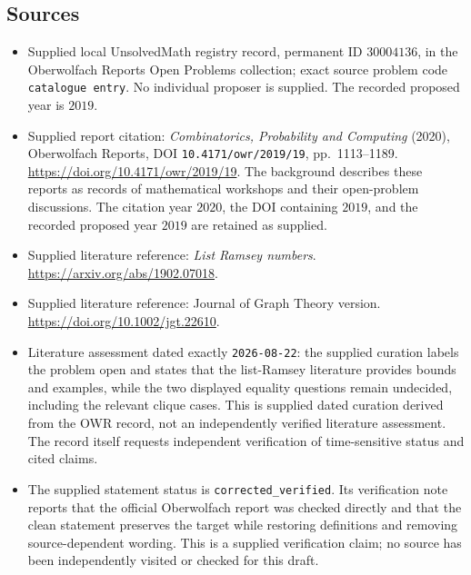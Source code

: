 \documentclass[11pt]{article}
\begin{document}
\subsection{Sources}
\begin{itemize}
\item Supplied local UnsolvedMath registry record, permanent ID \(30004136\), in the Oberwolfach Reports Open Problems collection; exact source problem code \texttt{catalogue entry}. No individual proposer is supplied. The recorded proposed year is \(2019\).
\item Supplied report citation: \emph{Combinatorics, Probability and Computing} (2020), Oberwolfach Reports, DOI \texttt{10.4171/owr/2019/19}, pp.~1113--1189. \url{https://doi.org/10.4171/owr/2019/19}. The background describes these reports as records of mathematical workshops and their open-problem discussions. The citation year \(2020\), the DOI containing \(2019\), and the recorded proposed year \(2019\) are retained as supplied.
\item Supplied literature reference: \emph{List Ramsey numbers}. \url{https://arxiv.org/abs/1902.07018}.
\item Supplied literature reference: Journal of Graph Theory version. \url{https://doi.org/10.1002/jgt.22610}.
\item Literature assessment dated exactly \texttt{2026-08-22}: the supplied curation labels the problem open and states that the list-Ramsey literature provides bounds and examples, while the two displayed equality questions remain undecided, including the relevant clique cases. This is supplied dated curation derived from the OWR record, not an independently verified literature assessment. The record itself requests independent verification of time-sensitive status and cited claims.
\item The supplied statement status is \texttt{corrected\_verified}. Its verification note reports that the official Oberwolfach report was checked directly and that the clean statement preserves the target while restoring definitions and removing source-dependent wording. This is a supplied verification claim; no source has been independently visited or checked for this draft.
\end{itemize}
\end{document}
